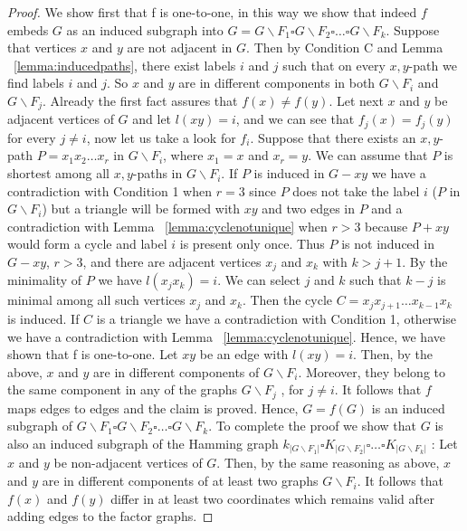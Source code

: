 \documentclass[12pt,a4paper,titlepage,openany]{report}
\begin{document}
\begin{proof}
We show first that f is one-to-one, in this way we show that indeed $f$ embeds $G$ as an induced subgraph into $G=G\backslash F_1\square G\backslash F_2\square \ldots \square G\backslash F_k$. Suppose that vertices $x$ and $y$ are not adjacent in $G$. Then by Condition C and Lemma ~\ref{lemma:inducedpaths}, there exist labels $i$ and $j$ such that on every $x, y$-path we find labels $i$ and $j$. So $x$ and $y$ are in different components in both $G\backslash F_i$ and $G\backslash F_j$. Already the first fact assures that $f(x)\neq f(y)$. Let next $x$ and $y$ be adjacent vertices of $G$ and let $l(xy)=i$, and we can see that $f_j(x)=f_j(y)$ for every $j\neq i$, now let us take a look for $f_i$. Suppose that there exists an $x, y$-path $P=x_1x_2\ldots x_r$ in $G\backslash F_i$, where $x_1=x$ and $x_r=y$. We can assume that $P$ is shortest among all $x, y$-paths in $G\backslash F_i$. If $P$ is induced in $G-xy$ we have a contradiction with Condition 1 when $r=3$ since $P$ does not take the label $i$ ($P$ in $G\backslash F_i$) but a triangle will be formed with $xy$ and two edges in $P$ and a contradiction with Lemma ~\ref{lemma:cyclenotunique} when $r>3$ because $P+xy$ would form a cycle and label $i$  is present only once. Thus $P$ is not induced in $G-xy$,
$r > 3$, and there are adjacent vertices $x_j$ and $x_k$ with $k > j+1$. By the minimality of $P$ we have $l(x_jx_k)=i$. We can select $j$ and $k$ such that $k- j$ is minimal among all such vertices $x_j$ and $x_k$. Then the cycle $C=x_jx_{j+1}\ldots x_{k-1}x_k$ is induced. If $C$ is a triangle we have a contradiction with Condition 1, otherwise we have a
contradiction with Lemma ~\ref{lemma:cyclenotunique}. Hence, we have shown that f is one-to-one.\newline
Let $xy$ be an edge with $l(xy)=i$. Then, by the above, $x$ and $y$ are in different components of $G\backslash F_i$. Moreover, they belong to the same component in any of the graphs $G\backslash F_j$ , for $j\neq i$. It follows that $f$ maps edges to edges and the claim is proved.\newline
Hence, $G=f(G)$ is an induced subgraph of $G\backslash F_1\square G\backslash F_2\square \ldots \square G\backslash F_k$. To complete the proof we show that $G$ is also an induced subgraph of the Hamming graph $k_{|G\backslash F_1|}\square K_{|G\backslash F_2|}\square \ldots \square K_{|G\backslash F_k|}$ :
Let $x$ and $y$ be non-adjacent vertices of $G$. Then, by the same reasoning as above, $x$ and $y$ are in different components of at least two graphs $G\backslash F_i$. It follows that $f(x)$ and $f(y)$ differ in at least two coordinates which remains valid after adding edges to the factor graphs.
\end{proof}
\end{document}
